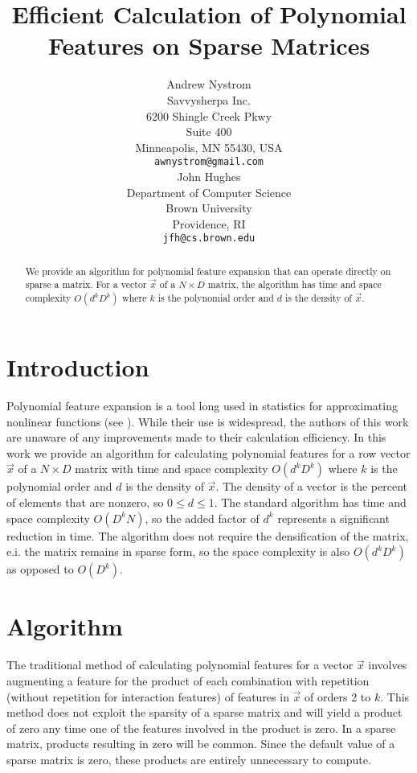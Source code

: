 \documentclass{article} %
\title{Efficient Calculation of Polynomial Features on Sparse Matrices}
\author{Andrew Nystrom \\
Savvysherpa Inc.\\
6200 Shingle Creek Pkwy \\
Suite 400 \\
Minneapolis, MN 55430, USA \\
\texttt{awnystrom@gmail.com} \\
\And
John Hughes \\
Department of Computer Science \\
Brown University \\
Providence, RI \\
\texttt{jfh@cs.brown.edu} \\
}
\begin{document}
\maketitle

\begin{abstract}
We provide an algorithm for polynomial feature expansion that can operate directly on sparse a
matrix. For a vector $\vec{x}$ of a $N \times D$ matrix, the algorithm has time and space complexity $O(d^kD^k)$ where $k$ is the polynomial order and $d$ is the density of $\vec{x}$.

\end{abstract}

\section{Introduction}

Polynomial feature expansion is a tool long used in statistics for approximating nonlinear functions (see \cite{gergonne1974application, smith1918standard}).
While their use is widespread, the authors of this work are unaware of any improvements made to their calculation efficiency.
In this work we provide an algorithm for calculating polynomial features for a row vector $\vec{x}$ of a $N \times D$ matrix with time and space complexity $O(d^kD^k)$ where $k$ is the polynomial order and $d$ is the density of $\vec{x}$.
The density of a vector is the percent of elements that are nonzero, so $0 \le d \le 1$.
The standard algorithm has time and space complexity $O(D^kN)$, so the added factor of $d^k$ represents a significant reduction in time.
The algorithm does not require the densification of the matrix, e.i. the matrix remains in sparse form, so the space complexity is also $O(d^kD^k)$ as opposed to $O(D^k)$.

\section{Algorithm}
The traditional method of calculating polynomial features for a vector $\vec{x}$ involves augmenting a feature for the product of each combination with repetition (without repetition for interaction features) of features in $\vec{x}$ of orders 2 to $k$.
This method does not exploit the sparsity of a sparse matrix and will yield a product of zero any time one of the features involved in the product is zero.
In a sparse matrix, products resulting in zero will be common.
Since the default value of a sparse matrix is zero, these products are entirely unnecessary to compute.
\end{document}

